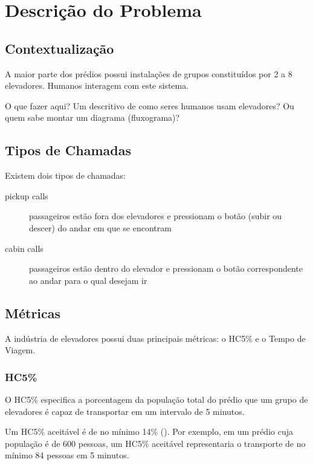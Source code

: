 \chapter{\label{chap:problem}Descrição do Problema}

\section{Contextualização}

A maior parte dos prédios possui instalações de grupos constituídos por 2 a 8 elevadores. Humanos interagem com este sistema.

O que fazer aqui? Um descritivo de como seres humanos usam elevadores? Ou quem sabe montar um diagrama (fluxograma)?

\section{Tipos de Chamadas}

Existem dois tipos de chamadas:

\begin{description}
\item[pickup calls] passageiros estão fora dos elevadores e pressionam o botão (subir ou descer) do andar em que se encontram
\item[cabin calls] passageiros estão dentro do elevador e pressionam o botão correspondente ao andar para o qual desejam ir
\end{description}

\section{Métricas}

  A indústria de elevadores possui duas principais métricas: o HC5\% e o Tempo de Viagem.

\subsection{HC5\%}

 O HC5\% especifica a porcentagem da população total do prédio que um grupo de elevadores é capaz de transportar em um intervalo de 5 minutos.

 Um HC5\% aceitável é de no mínimo 14\% (\cite{KOEHLEROTTIGER02}). Por exemplo, em um prédio cuja população é de 600 pessoas, um HC5\% aceitável representaria o transporte de no mínimo 84 pessoas em 5 minutos.

